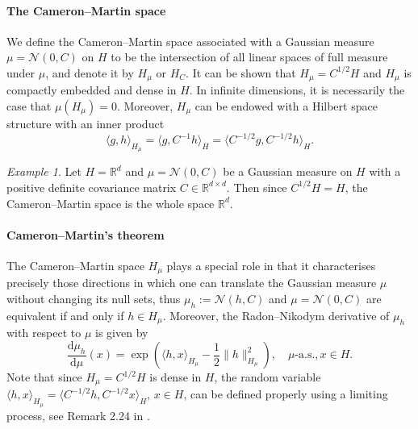 \documentclass[10pt]{article} %
\newcommand{\R}{\mathbb{R}}
\theoremstyle{plain}
\theoremstyle{definition}
\theoremstyle{remark}
\newtheorem{example}{Example}
\newcommand{\dd}{{\mathrm d}}
\begin{document}
\paragraph{The Cameron--Martin space} We define the Cameron--Martin space associated with a Gaussian measure $\mu = \mathcal{N}(0, C)$ on $H$ to be the intersection of all linear spaces of full measure under $\mu$, and denote it by $H_\mu$ or $H_C$. It can be shown that $H_\mu = C^{1/2} H$ and $H_\mu$ is compactly embedded and dense in $H$. In infinite dimensions, it is necessarily the case that $\mu(H_\mu) = 0$. Moreover, $H_\mu$ can be endowed with a Hilbert space structure with an inner product
\begin{equation*}
    \langle g, h\rangle_{H_\mu} = \langle g, C^{-1}h\rangle_H = \langle C^{-1/2}g, C^{-1/2}h\rangle_H.
\end{equation*}
\begin{example}
    Let $H=\R^d$ and $\mu = \mathcal{N}(0,C)$ be a Gaussian measure on $H$ with a positive definite covariance matrix $C \in \R^{d\times d}$. Then since $C^{1/2}H = H$, the Cameron--Martin space is the whole space $\R^d$. 
\end{example}
\paragraph{Cameron--Martin's theorem} The Cameron–Martin space $H_\mu$ plays a special role in that it characterises precisely those directions in which one can translate the Gaussian measure $\mu$ without changing its null sets, thus $\mu_h:= \mathcal{N}(h, C)$ and $\mu = \mathcal{N}(0, C)$ are equivalent if and only if $h\in H_\mu$. Moreover, the Radon--Nikodym derivative of $\mu_h$ with respect to $\mu$ is given by
\begin{equation}\label{CM-theorem}
    \frac{\dd\mu_h}{\dd\mu}(x) = \exp\left( \langle h, x\rangle_{H_\mu} - \frac{1}{2}\|h\|_{H_\mu}^2 \right), \quad \mu\text{-a.s.}, x\in H.
\end{equation}
Note that since $H_\mu=C^{1/2}H$ is dense in $H$, the random variable $\langle h, x\rangle_{H_\mu} = \langle C^{-1/2}h, C^{-1/2}x\rangle_H$, $x\in H$, can be defined properly using a limiting process, see Remark 2.24 in  \citet{da2014stochastic}.
\end{document}
